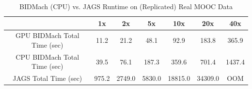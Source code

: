 \documentclass{article} %
\begin{document}
%
%
% 
%
%
%
%
%
\begin{table}[t]
\small
\caption{BIDMach (CPU) vs. JAGS Runtime on (Replicated) Real MOOC Data}
\label{tab:bidmach_jags_realmooc}
\begin{center}
\begin{tabular}{ |c|c|c|c|c|c|c| } 
\hline
                             & 1x    & 2x     & 5x     & 10x     & 20x     & 40x    \\
\hline \hline
GPU BIDMach Total Time (sec) & 11.2  & 21.2   & 48.1   & 92.9    & 183.8   & 365.9  \\ 
CPU BIDMach Total Time (sec) & 39.5  & 76.1   & 187.3  & 359.6   & 701.4   & 1437.4 \\ 
JAGS Total Time (sec)        & 975.2 & 2749.0 & 5830.0 & 18815.0 & 34309.0 & OOM    \\
\hline
\end{tabular}
\end{center}
\end{table}
\end{document}

